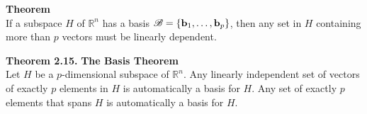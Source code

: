 \begin{boxthm}
	\textbf{Theorem} \\
	If a subspace $H$ of $\mathbb{R}^n$ has a basis $\B=\vectset[b]{1}{p}$, then any set in $H$ containing more than $p$ vectors must be linearly dependent.
\end{boxthm}
\vspace{-1em}
\begin{boxthm}
	\textbf{Theorem 2.15.}
	\textbf{The Basis Theorem} \\
	Let $H$ be a $p$-dimensional subspace of $\mathbb{R}^n$. Any linearly independent set of vectors of exactly $p$ elements in $H$ is automatically a basis for $H$. Any set of exactly $p$ elements that spans $H$ is automatically a basis for $H$.
\end{boxthm}


